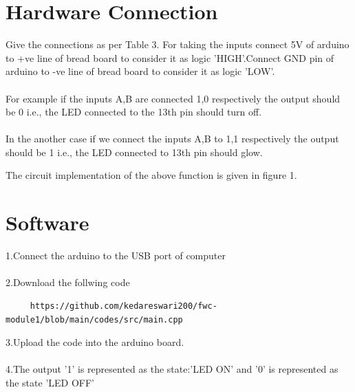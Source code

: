 \documentclass[10pt, a4paper]{article}
\begin{document}
   \section{Hardware Connection}
   
Give the connections as per Table 3. For taking the inputs connect 5V of arduino to +ve line of bread board to consider it as logic 'HIGH'.Connect GND pin of arduino to -ve line of bread board to consider it as logic 'LOW'.
\\
\\
For example if the inputs A,B are connected 1,0 respectively the output should be 0 i.e., the LED connected to the 13th pin should turn off.
\\
\\
In the another case if we connect the inputs A,B to 1,1 respectively the output should be 1 i.e., the LED connected to 13th pin should glow.

The circuit implementation of the above function is given in figure 1.








  \section{Software}
  1.Connect the arduino to the USB port of computer
  \\
  \\2.Download the follwing code
  \\
  \begin{lstlisting}
     https://github.com/kedareswari200/fwc-module1/blob/main/codes/src/main.cpp
  \end{lstlisting}
  
  3.Upload the code into the arduino board.
  \\
  \\4.The output '1' is represented as the state:'LED ON' and '0' is represented as the state 'LED OFF' 
 
  
\end{document}
